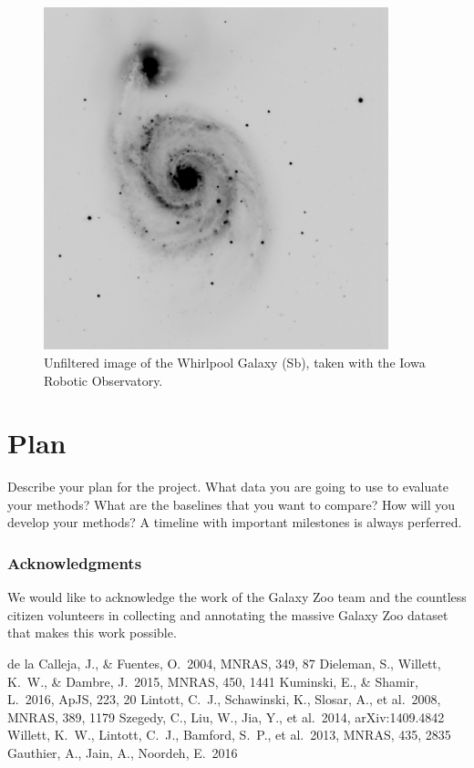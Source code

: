 \documentclass{article}
\begin{document}
\begin{figure}[h]
  \centering
	\includegraphics[width=100mm]{../img/M51.pdf}
  \caption{Unfiltered image of the Whirlpool Galaxy (Sb), taken with the Iowa Robotic Observatory.}
  \label{fig:M51}
\end{figure}


\section{Plan}
Describe your plan for the project. What data you are going to use to evaluate your methods? What are the baselines that you want to compare? How will you develop your methods?   A timeline with important milestones is always perferred.



\subsubsection*{Acknowledgments}

We would like to acknowledge the work of the Galaxy Zoo team and the countless citizen volunteers in collecting and annotating the massive Galaxy Zoo dataset that makes this work possible. 


\begin{thebibliography}{9}
 de la Calleja, J., \& Fuentes, O.\ 2004, MNRAS, 349, 87 
 Dieleman, S., Willett, K.~W., \& Dambre, J.\ 2015, MNRAS, 450, 1441 
 Kuminski, E., \& Shamir, L.\ 2016, ApJS, 223, 20 
 Lintott, C.~J., Schawinski, K., Slosar, A., et al.\ 2008, MNRAS, 389, 1179
 Szegedy, C., Liu, W., Jia, Y., et al.\ 2014, arXiv:1409.4842 
 Willett, K.~W., Lintott, C.~J., Bamford, S.~P., et al.\ 2013, MNRAS, 435, 2835  
 Gauthier, A., Jain, A., Noordeh, E.\ 2016
\end{thebibliography}
\end{document}
